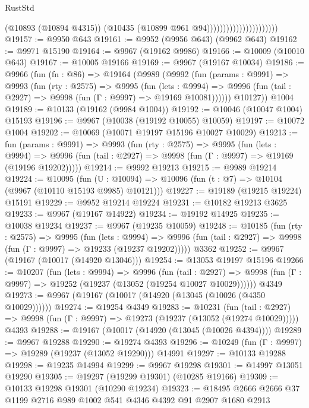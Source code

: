 \begin{lexlean}{RustStd}
\begin{coremodule}
{\begin{coremodule}
{{{{{{{{{{{{{{{{{{{{{{{{{{{{{{{{{{{{{{{{{{{{{{{{{{{{{{{{{{{{{{{{{{{{{{{{{{{{{{                                            (@10893 (@10894 @4315))
                                            (@10435 (@10899 @961 @94))))))))))))))))))))))
@19157 := @9950 @643
@19161 := @9952 (@9956 @643) (@9962 @643)
@19162 := @9971 @15190
@19164 := @9967 (@19162 @9986)
@19166 := @10009 (@10010 @643)
@19167 := @10005 @19166
@19169 := @9967 (@19167 @10034)
@19186 := @9966
    (fun (fn : @86) =>
    @19164
      (@9989
        (@9992
          (fun (params : @9991) =>
          @9993
            (fun (rty : @2575) =>
            @9995
              (fun (lets : @9994) =>
              @9996 (fun (tail : @2927) => @9998 (fun (Γ : @9997) => @19169 @10081))))))
        @10127))
    @1004
@19189 := @10133 (@19162 (@9984 @1004))
@19192 := @10046 (@10047 @1004) @15193
@19196 := @9967 (@10038 (@19192 @10055) @10059)
@19197 := @10072 @1004
@19202 := @10069 (@10071 @19197 @15196 @10027 @10029)
@19213 := fun (params : @9991) =>
  @9993
    (fun (rty : @2575) =>
    @9995
      (fun (lets : @9994) =>
      @9996 (fun (tail : @2927) => @9998 (fun (Γ : @9997) => @19169 (@19196 @19202)))))
@19214 := @9992 @19213
@19215 := @9989 @19214
@19224 := @10095
    (fun (U : @10094) => @10096 (fun (t : @7) => @10104 (@9967 (@10110 @15193 @9985) @10121)))
@19227 := @19189 (@19215 @19224) @15191
@19229 := @9952 @19214 @19224
@19231 := @10182 @19213 @3625
@19233 := @9967 (@19167 @14922)
@19234 := @19192 @14925
@19235 := @10038 @19234
@19237 := @9967 (@19235 @10059)
@19248 := @10185
    (fun (rty : @2575) =>
    @9995
      (fun (lets : @9994) =>
      @9996 (fun (tail : @2927) => @9998 (fun (Γ : @9997) => @19233 (@19237 @19202)))))
    @3362
@19252 := @9967 (@19167 (@10017 (@14920 @13046)))
@19254 := @13053 @19197 @15196
@19266 := @10207
    (fun (lets : @9994) =>
    @9996
      (fun (tail : @2927) =>
      @9998 (fun (Γ : @9997) => @19252 (@19237 (@13052 (@19254 @10027 @10029))))))
    @4349
@19273 := @9967 (@19167 (@10017 (@14920 (@13045 (@10026 (@4350 @10029))))))
@19274 := @19254 @4349
@19283 := @10231
    (fun (tail : @2927) => @9998 (fun (Γ : @9997) => @19273 (@19237 (@13052 (@19274 @10029)))))
    @4393
@19288 := @19167 (@10017 (@14920 (@13045 (@10026 @4394))))
@19289 := @9967 @19288
@19290 := @19274 @4393
@19296 := @10249 (fun (Γ : @9997) => @19289 (@19237 (@13052 @19290))) @14991
@19297 := @10133 @19288
@19298 := @19235 @14994
@19299 := @9967 @19298
@19301 := @14997 @13051 @19290
@19305 := @19297 (@19299 @19301) (@10285 @19166)
@19309 := @10133 @19298 @19301 (@10290 @19234)
@19323 := @18495 @2666 @2666 @37 @1199 @2716 @989 @1002 @541 @4346 @4392 @91 @2907 @1680 @2913
}}}}}}}}}}}}}}}}}}}}}}}}}}}}}}}}}}}}}}}}}}}}}}}}}}}}}}}}}}}}}}}}}}}}}}}}}}}}}}
\end{coremodule}}
\end{coremodule}
\end{lexlean}

